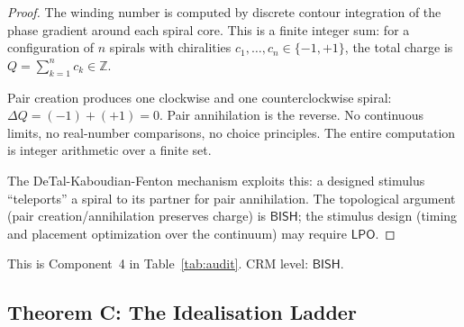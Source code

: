 \documentclass[11pt,a4paper]{article}
\theoremstyle{plain}
\theoremstyle{definition}
\newcommand{\BISH}{\textsf{BISH}}
\newcommand{\LPO}{\textsf{LPO}}
\newcommand{\Z}{\mathbb{Z}}
\begin{document}
\begin{proof}
The winding number is computed by discrete contour integration of the phase gradient around each spiral core.  This is a finite integer sum: for a configuration of $n$ spirals with chiralities $c_1, \ldots, c_n \in \{-1, +1\}$, the total charge is $Q = \sum_{k=1}^n c_k \in \Z$.

Pair creation produces one clockwise and one counterclockwise spiral: $\Delta Q = (-1) + (+1) = 0$.  Pair annihilation is the reverse.  No continuous limits, no real-number comparisons, no choice principles.  The entire computation is integer arithmetic over a finite set.

The DeTal-Kaboudian-Fenton mechanism \cite{detal2022} exploits this: a designed stimulus ``teleports'' a spiral to its partner for pair annihilation.  The topological argument (pair creation/annihilation preserves charge) is $\BISH$; the stimulus design (timing and placement optimization over the continuum) may require $\LPO$.
\end{proof}

This is Component~4 in Table~\ref{tab:audit}.  CRM level: $\BISH$.

\subsection{Theorem C: The Idealisation Ladder}
\end{document}
